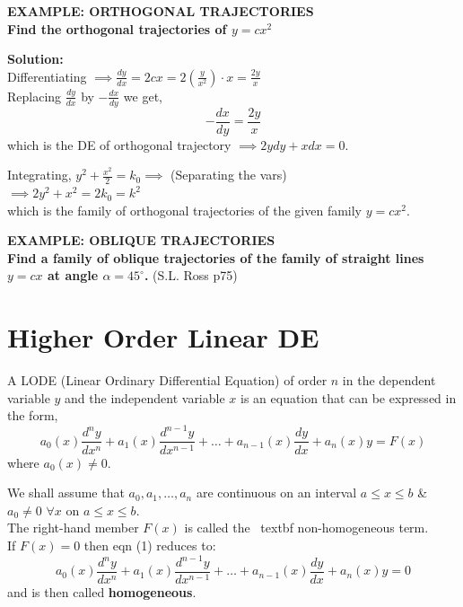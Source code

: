\documentclass[11pt,a4paper]{article}
\begin{document}
\begin{tcolorbox}[colback=LightBg, colframe=BorderGray, arc=4mm]
    {\small\textbf{\textcolor{AccentBlue}{EXAMPLE: ORTHOGONAL TRAJECTORIES}}}
    \vspace{0.2cm}\\
    \textbf{Find the orthogonal trajectories of $y = cx^2$}
    
    \vspace{0.2cm}
    \textbf{Solution:} \\
    Differentiating $\implies \displaystyle \frac{dy}{dx} = 2cx = 2 \left(\frac{y}{x^2}\right) \cdot x = \frac{2y}{x}$ \\
    Replacing $\frac{dy}{dx}$ by $-\frac{dx}{dy}$ we get,
    \[ -\frac{dx}{dy} = \frac{2y}{x} \]
    which is the DE of orthogonal trajectory $\implies 2y dy + x dx = 0$.
    
    Integrating, $y^2 + \frac{x^2}{2} = k_0 \implies$ (Separating the vars) \\
    $\implies 2y^2 + x^2 = 2k_0 = k^2$ \\
    which is the family of orthogonal trajectories of the given family $y = cx^2$.
\end{tcolorbox}

\begin{tcolorbox}[colback=LightBg, colframe=BorderGray, arc=4mm]
    {\small\textbf{\textcolor{AccentBlue}{EXAMPLE: OBLIQUE TRAJECTORIES}}}
    \vspace{0.2cm}\\
    \textbf{Find a family of oblique trajectories of the family of straight lines $y = cx$ at angle $\alpha = 45^\circ$.} (S.L. Ross p75)
\end{tcolorbox}

\section{Higher Order Linear DE}
A LODE (Linear Ordinary Differential Equation) of order $n$ in the dependent variable $y$ and the independent variable $x$ is an equation that can be expressed in the form, 
\begin{equation}
    a_0(x)\frac{d^ny}{dx^n} + a_1(x)\frac{d^{n-1}y}{dx^{n-1}} + \dots + a_{n-1}(x)\frac{dy}{dx} + a_n(x)y = F(x)
\end{equation}
where $a_0(x) \neq 0$.

We shall assume that $a_0, a_1, \dots, a_n$ are continuous on an interval $a \leq x \leq b$ \& $a_0 \neq 0$ $\forall x$ on $a \leq x \leq b$. \\
The right-hand member $F(x)$ is called the \ textbf {non-homogeneous} term. \\
If $F(x) = 0$ then eqn (1) reduces to:
\begin{equation}
    a_0(x)\frac{d^ny}{dx^n} + a_1(x)\frac{d^{n-1}y}{dx^{n-1}} + \dots + a_{n-1}(x)\frac{dy}{dx} + a_n(x)y = 0
\end{equation}
and is then called \textbf{homogeneous}.
\end{document}

